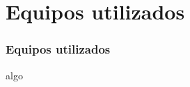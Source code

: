 \section{Equipos utilizados}
  \begin{frame}
    \frametitle{Equipos utilizados}
    algo
  \end{frame}

